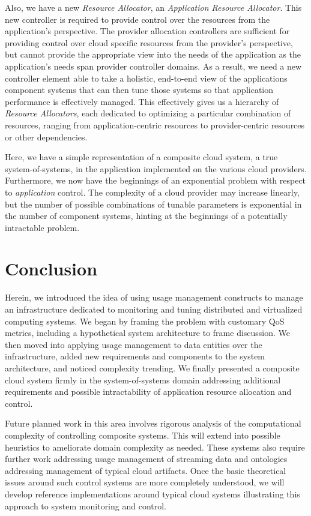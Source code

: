 \documentclass[times, 10pt,twocolumn]{article}
\begin{document}
Also, we have a new \textit{Resource Allocator}, an \textit{Application Resource Allocator}.  This new controller is required to provide control over the resources from the application's perspective.  The provider allocation controllers are sufficient for providing control over cloud specific resources from the provider's perspective, but cannot provide the appropriate view into the needs of the application as the application's needs span provider controller domains. As a result, we need a new controller element able to take a holistic, end-to-end view of the applications component systems that can then tune those systems so that application performance is effectively managed.  This effectively gives us a hierarchy of \textit{Resource Allocators}, each dedicated to optimizing a particular combination of resources, ranging from application-centric resources to provider-centric resources or other dependencies.

Here, we have a simple representation of a composite cloud system, a true system-of-systems, in the application implemented on the various cloud providers.  Furthermore, we now have the beginnings of an exponential problem with respect to \textit{application} control.  The complexity of a cloud provider may increase linearly, but the number of possible combinations of tunable parameters is exponential in the number of component systems, hinting at the beginnings of a potentially intractable problem.

\section{Conclusion}
Herein, we introduced the idea of using usage management constructs to manage an infrastructure dedicated to monitoring and tuning distributed and virtualized computing systems.  We began by framing the problem with customary QoS metrics, including a hypothetical system architecture to frame discussion.  We then moved into applying usage management to data entities over the infrastructure, added new requirements and components to the system architecture, and noticed complexity trending.  We finally presented a composite cloud system firmly in the system-of-systems domain addressing additional requirements and possible intractability of application resource allocation and control.

Future planned work in this area involves rigorous analysis of the computational complexity of controlling composite systems.  This will extend into possible heuristics to ameliorate domain complexity as needed.  These systems also require further work addressing usage management of streaming data and ontologies addressing management of typical cloud artifacts.  Once the basic theoretical issues around such control systems are more completely understood, we will develop reference implementations around typical cloud systems illustrating this approach to system monitoring and control.



\end{document}
